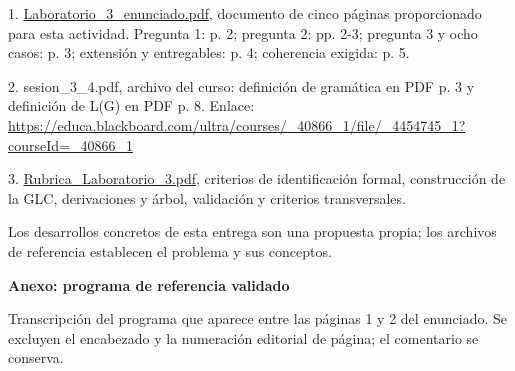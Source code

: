\documentclass[10pt,a4paper]{article}
\newcommand{\ReportSection}[1]{\par{\color{Accent}\bfseries\fontsize{16}{20}\selectfont #1\par}\vspace{5pt}}
\newcommand{\ReportHeading}[1]{\par\addvspace{6pt}{\color{Accent}\bfseries\fontsize{10.8}{14}\selectfont #1\par}\nobreak\vspace{2pt}}
\begin{document}
\ReportHeading{Fuentes}

1. \href{https://drive.google.com/file/d/1dWAGayupZWFKaRqMTrzPXSf6t30L21k8/view}{Laboratorio\_\allowbreak{}3\_\allowbreak{}enunciado.pdf}, documento de cinco páginas proporcionado para esta actividad. Pregunta 1: p. 2; pregunta 2: pp. 2-3; pregunta 3 y ocho casos: p. 3; extensión y entregables: p. 4; coherencia exigida: p. 5.
\par

2. sesion\_\allowbreak{}3\_\allowbreak{}4.pdf, archivo del curso: definición de gramática en PDF p. 3 y definición de L(G) en PDF p. 8. Enlace: \url{https://educa.blackboard.com/ultra/courses/_40866_1/file/_4454745_1?courseId=_40866_1}
\par

3. \href{https://drive.google.com/file/d/1OJxHs1ERN404OiHG-l35q1IYpkBgYAvt/view}{Rubrica\_\allowbreak{}Laboratorio\_\allowbreak{}3.pdf}, criterios de identificación formal, construcción de la GLC, derivaciones y árbol, validación y criterios transversales.
\par

Los desarrollos concretos de esta entrega son una propuesta propia; los archivos de referencia establecen el problema y sus conceptos.
\par

\clearpage

\ReportSection{Anexo: programa de referencia validado}

Transcripción del programa que aparece entre las páginas 1 y 2 del enunciado. Se excluyen el encabezado y la numeración editorial de página; el comentario se conserva.
\par
\end{document}
